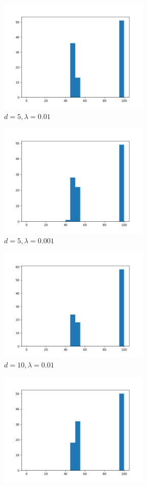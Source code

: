 \documentclass[titlepage]{report}
\begin{document}
\begin{figure}[H]
\centering
\begin{subfigure}{7cm}
\centering\includegraphics[width = 72mm]{figures/histograms/factor5/manual/5-01}
\caption{$d = 5, \lambda = 0.01$}
\end{subfigure}
\begin{subfigure}{7cm}
\centering\includegraphics[width = 72mm]{figures/histograms/factor5/manual/5-001}
\caption{$d = 5, \lambda = 0.001$}
\end{subfigure}
\begin{subfigure}{7cm}
\centering\includegraphics[width = 72mm]{figures/histograms/factor5/manual/10-01}
\caption{$d = 10, \lambda = 0.01$}
\end{subfigure}
\begin{subfigure}{7cm}
\centering\includegraphics[width = 72mm]{figures/histograms/factor5/manual/10-001}

\end{subfigure}
\end{figure}
\end{document}
